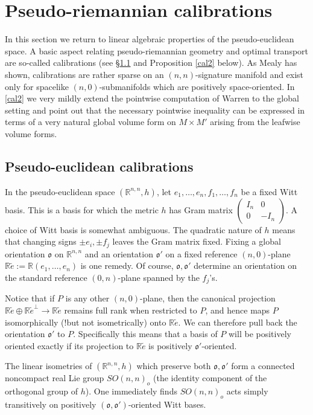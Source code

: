 \documentclass[12pt]{amsart}
\theoremstyle{definition}
\theoremstyle{remark}
\newcommand{\fo}{\mathfrak{o}}
\newcommand{\bR}{\mathbb{R}}
\begin{document}
\section{Pseudo-riemannian calibrations}\label{calibrations}
In this section we return to linear algebraic properties of the pseudo-euclidean space. A basic aspect relating pseudo-riemannian geometry and optimal transport are so-called calibrations (see \S\ref{cal1} and Proposition \ref{cal2} below). As Mealy \cite{M} has shown, calibrations are rather sparse on an $(n,n)$-signature manifold and exist only for spacelike $(n,0)$-submanifolds which are positively space-oriented. In \ref{cal2} we very mildly extend the pointwise computation of Warren \cite{W} to the global setting and point out that the necessary pointwise inequality can be expressed in terms of a very natural global volume form on $M \times M'$ arising from the leafwise volume forms.     

\subsection{Pseudo-euclidean calibrations}\label{cal1}
In the pseudo-euclidean space $(\bR^{n,n},h)$, let $e_1, \ldots, e_n, f_1, \ldots, f_n$ be a fixed Witt basis. This is a basis for which the metric $h$ has Gram matrix $\begin{pmatrix}I_n & 0\\ 0& -I_n  \end{pmatrix}$. A choice of Witt basis is somewhat ambiguous. The quadratic nature of $h$ means that changing signs $\pm e_i, \pm f_j$ leaves the Gram matrix fixed.  Fixing a global orientation $\mathfrak{o}$ on $\bR^{n,n}$ and an orientation $\mathfrak{o}'$ on a fixed reference $(n,0)$-plane $\bR \tilde{e}:=\bR(e_1, \ldots, e_n)$ is one remedy. Of course, $\fo, \fo'$ determine an orientation on the standard reference $(0,n)$-plane spanned by the $f_j$'s. 

Notice that if $P$ is any other $(n,0)$-plane, then the canonical projection $\bR \tilde{e} \oplus \bR \tilde{e}^\perp \to \bR \tilde{e}$ remains full rank when restricted to $P$, and hence maps $P$ isomorphically (!but not isometrically) onto $\bR \tilde{e}$. We can therefore pull back the orientation $\mathfrak{o}'$ to $P$. Specifically this means that a basis of $P$ will be positively oriented exactly if its projection to $\bR \tilde{e}$ is positively $\mathfrak{o}'$-oriented.

The linear isometries of $(\bR^{n,n},h)$ which preserve both $\mathfrak{o}, \mathfrak{o}'$ form a connected noncompact real Lie group $SO(n,n)_o$ (the identity component of the orthogonal group of $h$). One immediately finds $SO(n,n)_o$ acts simply transitively on positively $(\fo, \fo')$-oriented Witt bases. 
\end{document}
